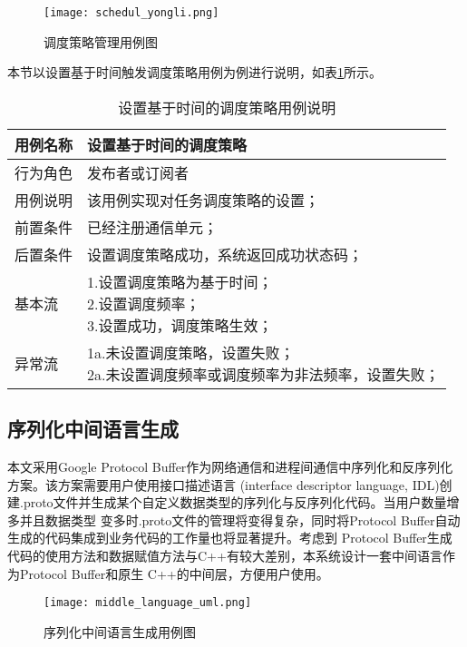 \begin{figure}[H]
  \centering
  \texttt{[image: schedul\_yongli.png]}
  \caption{调度策略管理用例图}
  \label{schedul_yongli}
\end{figure}

本节以设置基于时间触发调度策略用例为例进行说明，如表\ref{set_scheduler_yongli}所示。

\begin{table}[H]
  \centering\small
  \renewcommand\arraystretch{1.2}
  \caption{设置基于时间的调度策略用例说明}
  \label{set_scheduler_yongli}
  \begin{tabular}{ll}
    \toprule
    \multicolumn{1}{l}{用例名称} & \multicolumn{1}{l}{设置基于时间的调度策略}  \\
    \midrule
    行为角色 & 发布者或订阅者\\
    用例说明 & 该用例实现对任务调度策略的设置；\\
    前置条件 & 已经注册通信单元；\\
    后置条件 & 设置调度策略成功，系统返回成功状态码；\\
    基本流   & \makecell[l]{1.设置调度策略为基于时间；\\2.设置调度频率；\\3.设置成功，调度策略生效；}\\
    异常流   & \makecell[l]{1a.未设置调度策略，设置失败；\\2a.未设置调度频率或调度频率为非法频率，设置失败；}\\
    \bottomrule
  \end{tabular}
\end{table}

\subsection{序列化中间语言生成}
本文采用Google Protocol Buffer作为网络通信和进程间通信中序列化和反序列化方案。该方案需要用户使用接口描述语言
(interface descriptor language, IDL)创建.proto文件并生成某个自定义数据类型的序列化与反序列化代码。当用户数量增多并且数据类型
变多时.proto文件的管理将变得复杂，同时将Protocol Buffer自动生成的代码集成到业务代码的工作量也将显著提升。考虑到
Protocol Buffer生成代码的使用方法和数据赋值方法与C++有较大差别，本系统设计一套中间语言作为Protocol Buffer和原生
C++的中间层，方便用户使用。

\begin{figure}[H]
  \centering
  \texttt{[image: middle\_language\_uml.png]}
  \caption{序列化中间语言生成用例图}
  \label{middle_language_uml}
\end{figure}

